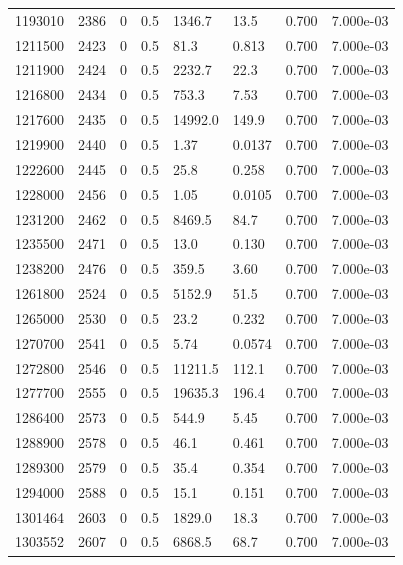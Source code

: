 \documentclass[preview]{standalone}
\begin{document}
{{{{\begin{tabular}{L{1.2cm}C{1.2cm} C{0.3cm}C{0.5cm} C{1.4cm}C{1.4cm} C{1.4cm}C{1.4cm}}
  1193010  &  2386  & 0     & 0.5 &  1346.7  & 13.5  & 0.700 &  7.000e-03   \\ 
  1211500  &  2423  & 0     & 0.5 &  81.3  & 0.813  & 0.700 &  7.000e-03   \\ 
  1211900  &  2424  & 0     & 0.5 &  2232.7  & 22.3  & 0.700 &  7.000e-03   \\ 
  1216800  &  2434  & 0     & 0.5 &  753.3  & 7.53  & 0.700 &  7.000e-03   \\ 
  1217600  &  2435  & 0     & 0.5 &  14992.0  & 149.9  & 0.700 &  7.000e-03   \\ 
  1219900  &  2440  & 0     & 0.5 &  1.37  & 0.0137  & 0.700 &  7.000e-03   \\ 
  1222600  &  2445  & 0     & 0.5 &  25.8  & 0.258  & 0.700 &  7.000e-03   \\ 
  1228000  &  2456  & 0     & 0.5 &  1.05  & 0.0105  & 0.700 &  7.000e-03   \\ 
  1231200  &  2462  & 0     & 0.5 &  8469.5  & 84.7  & 0.700 &  7.000e-03   \\ 
  1235500  &  2471  & 0     & 0.5 &  13.0  & 0.130  & 0.700 &  7.000e-03   \\ 
  1238200  &  2476  & 0     & 0.5 &  359.5  & 3.60  & 0.700 &  7.000e-03   \\ 
  1261800  &  2524  & 0     & 0.5 &  5152.9  & 51.5  & 0.700 &  7.000e-03   \\ 
  1265000  &  2530  & 0     & 0.5 &  23.2  & 0.232  & 0.700 &  7.000e-03   \\ 
  1270700  &  2541  & 0     & 0.5 &  5.74  & 0.0574  & 0.700 &  7.000e-03   \\ 
  1272800  &  2546  & 0     & 0.5 &  11211.5  & 112.1  & 0.700 &  7.000e-03   \\ 
  1277700  &  2555  & 0     & 0.5 &  19635.3  & 196.4  & 0.700 &  7.000e-03   \\ 
  1286400  &  2573  & 0     & 0.5 &  544.9  & 5.45  & 0.700 &  7.000e-03   \\ 
  1288900  &  2578  & 0     & 0.5 &  46.1  & 0.461  & 0.700 &  7.000e-03   \\ 
  1289300  &  2579  & 0     & 0.5 &  35.4  & 0.354  & 0.700 &  7.000e-03   \\ 
  1294000  &  2588  & 0     & 0.5 &  15.1  & 0.151  & 0.700 &  7.000e-03   \\ 
  1301464  &  2603  & 0     & 0.5 &  1829.0  & 18.3  & 0.700 &  7.000e-03   \\ 
  1303552  &  2607  & 0     & 0.5 &  6868.5  & 68.7  & 0.700 &  7.000e-03   \\ 

\end{tabular}}}}}
\end{document}
